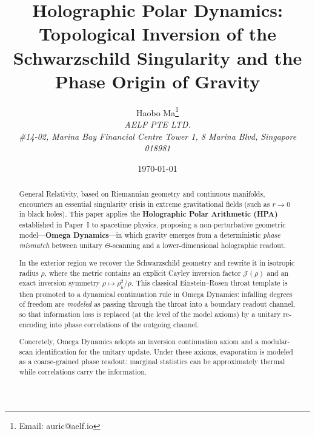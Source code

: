 \documentclass[11pt,a4paper]{article}
\title{Holographic Polar Dynamics: Topological Inversion of the Schwarzschild Singularity and the Phase Origin of Gravity}
\author{Haobo Ma\thanks{Email: auric@aelf.io} \\
\textit{AELF PTE LTD.} \\
\textit{\#14-02, Marina Bay Financial Centre Tower 1, 8 Marina Blvd, Singapore 018981}}
\date{\today}
\begin{document}
\maketitle

\begin{abstract}
General Relativity, based on Riemannian geometry and continuous manifolds, encounters an essential singularity crisis in extreme gravitational fields (such as $r \to 0$ in black holes). This paper applies the \textbf{Holographic Polar Arithmetic (HPA)} established in Paper~I \cite{Ma2025HPA} to spacetime physics, proposing a non-perturbative geometric model---\textbf{Omega Dynamics}---in which gravity emerges from a deterministic \emph{phase mismatch} between unitary $\Theta$-scanning and a lower-dimensional holographic readout.

In the exterior region we recover the Schwarzschild geometry and rewrite it in isotropic radius $\rho$, where the metric contains an explicit Cayley inversion factor $\mathcal{J}(\rho)$ and an exact inversion symmetry $\rho\mapsto\rho_h^2/\rho$. This classical Einstein--Rosen throat template is then promoted to a dynamical continuation rule in Omega Dynamics: infalling degrees of freedom are \emph{modeled} as passing through the throat into a boundary readout channel, so that information loss is replaced (at the level of the model axioms) by a unitary re-encoding into phase correlations of the outgoing channel.
\par
Concretely, Omega Dynamics adopts an inversion continuation axiom and a modular-scan identification for the unitary update. Under these axioms, evaporation is modeled as a coarse-grained phase readout: marginal statistics can be approximately thermal while correlations carry the information.
\end{abstract}








\appendix




\end{document}
